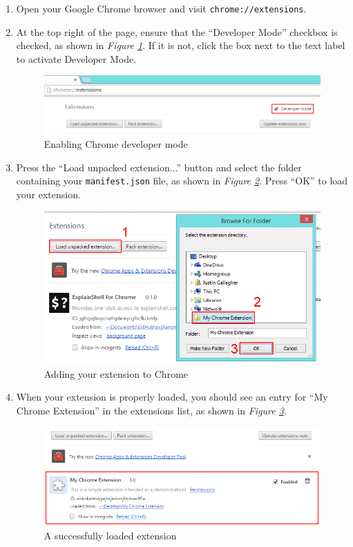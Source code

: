 \documentclass[11pt]{article}
\begin{document}
\begin{enumerate}
	\item Open your Google Chrome browser and visit \texttt{chrome://extensions}.
	\item At the top right of the page, ensure that the ``Developer Mode'' checkbox is checked, as shown in \emph{Figure \ref{fig:devmode}}. If it is not, click the box next to the text label to activate Developer Mode.

	\begin{figure}[htb]
	\centering
	\includegraphics[width=1\textwidth]{figures/devmode.png}
	\caption{Enabling Chrome developer mode\label{fig:devmode}}
	\end{figure}

	\item Press the ``Load unpacked extension...'' button and select the folder containing your \texttt{manifest.json} file, as shown in \emph{Figure \ref{fig:loadext}}. Press ``OK'' to load your extension.

	\begin{figure}[htb]
	\centering
	\includegraphics[height=0.5\textwidth]{figures/loadext.png}
	\caption{Adding your extension to Chrome\label{fig:loadext}}
	\end{figure}

	\item When your extension is properly loaded, you should see an entry for ``My Chrome Extension'' in the extensions list, as shown in \emph{Figure \ref{fig:loadedext}}.

	\begin{figure}[htb]
	\centering
	\includegraphics[width=1\textwidth]{figures/loadedext.png}
	\caption{A successfully loaded extension\label{fig:loadedext}}
	\end{figure}
\end{enumerate}
\end{document}
